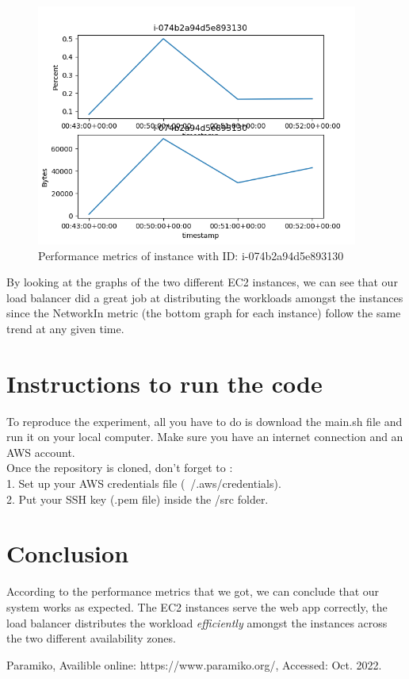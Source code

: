 \documentclass[12pt]{article}
\begin{document}
\begin{figure}[htbp]
\centering
  \includegraphics[height=300px]{i-074b2a94d5e893130.png}
  \caption{Performance metrics of instance with ID: i-074b2a94d5e893130}
\end{figure}

By looking at the graphs of the two different EC2 instances, we can see that our load balancer did a great job at distributing the workloads amongst the instances since the NetworkIn metric (the bottom graph for each instance) follow the same trend at any given time.

\section{Instructions to run the code}

To reproduce the experiment, all you have to do is download the main.sh file and run it on your local computer. Make sure you have an internet connection and an AWS account. \\
Once the repository is cloned, don't forget to : \\
1. Set up your AWS credentials file (~/.aws/credentials). \\
2. Put your SSH key (.pem file) inside the /src folder.

\section{Conclusion}

According to the performance metrics that we got, we can conclude that our system works as expected. The EC2 instances serve the web app correctly, the load balancer distributes the workload \emph{efficiently} amongst the instances across the two different availability zones.

\begin{thebibliography}{9}
Paramiko, Availible online: https://www.paramiko.org/, Accessed: Oct. 2022. 
\end{thebibliography}
\end{document}
